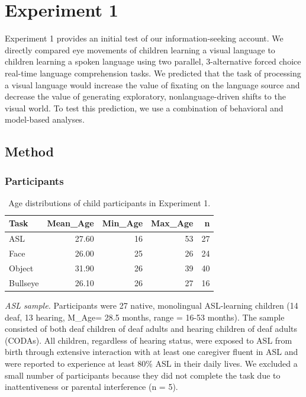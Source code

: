 \documentclass[10pt, letterpaper]{article}
\begin{document}
\section{Experiment 1}\label{experiment-1}

Experiment 1 provides an initial test of our information-seeking
account. We directly compared eye movements of children learning a
visual language to children learning a spoken language using two
parallel, 3-alternative forced choice real-time language comprehension
tasks. We predicted that the task of processing a visual language would
increase the value of fixating on the language source and decrease the
value of generating exploratory, nonlanguage-driven shifts to the visual
world. To test this prediction, we use a combination of behavioral and
model-based analyses.

\subsection{Method}\label{method}

\subsubsection{Participants}\label{participants}

\begin{table}[b]
\centering
\begin{tabular}{lrrrr}
  \hline
Task & Mean\_Age & Min\_Age & Max\_Age & n \\ 
  \hline
ASL & 27.60 &  16 &  53 &  27 \\ 
  Face & 26.00 &  25 &  26 &  24 \\ 
  Object & 31.90 &  26 &  39 &  40 \\ 
  Bullseye & 26.10 &  26 &  27 &  16 \\ 
   \hline
\end{tabular}
\caption{Age distributions of child participants in Experiment 1.} 
\end{table}

\emph{ASL sample.} Participants were 27 native, monolingual ASL-learning
children (14 deaf, 13 hearing, M\_Age= 28.5 months, range = 16-53
months). The sample consisted of both deaf children of deaf adults and
hearing children of deaf adults (CODAs). All children, regardless of
hearing status, were exposed to ASL from birth through extensive
interaction with at least one caregiver fluent in ASL and were reported
to experience at least 80\% ASL in their daily lives. We excluded a
small number of participants because they did not complete the task due
to inattentiveness or parental interference (n = 5).
\end{document}
